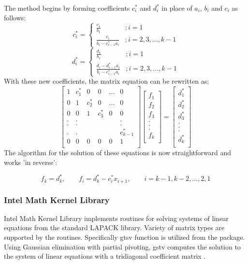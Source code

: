 \documentclass[12pt, oneside]{book}
\theoremstyle{plain}
\theoremstyle{definition}
\begin{document}
The method begins by forming coefficients \(c^{*}_i\) and \(d^{*}_i\) in place of \(a_i\), \(b_i\) and \(c_i\) as follows:
$$
c^{*}_i = \left\{
     \begin{array}{lr}
       \frac{c_1}{b_1} & ; i = 1\\
       \frac{c_i}{b_i - c^{*}_{i-1} a_i} & ; i = 2,3,...,k-1
     \end{array}
   \right.
$$
$$   
d^{*}_i = \left\{
     \begin{array}{lr}
       \frac{d_1}{b_1} & ; i = 1\\
       \frac{d_i-d^{*}_{i-1} a_i}{b_i - c^{*}_{i-1} a_i} & ; i = 2,3,...,k-1
     \end{array}
   \right.
   $$
With these new coefficients, the matrix equation can be rewritten as:
$$
\begin{bmatrix}  
1 & c^{*}_1 & 0 & 0 & ... & 0 \\ 
0 & 1 & c^{*}_2 & 0 & ... & 0 \\ 
0 & 0 & 1 & c^{*}_3 & 0 & 0 \\ 
. & . &  &  &  & . \\ 
. & . &  &  &  & . \\ 
. & . &  &  &  & c^{*}_{k-1} \\ 
0 & 0 & 0 & 0 & 0 & 1 \\ 
\end{bmatrix} \begin{bmatrix}  
f_1 \\ 
f_2 \\ 
f_3 \\ 
.\\ 
.\\ 
.\\ 
f_k \\ 
\end{bmatrix} = \begin{bmatrix} 
d^{*}_1 \\ 
d^{*}_2 \\ 
d^{*}_3 \\ 
.\\ 
.\\ 
.\\ 
d^{*}_k \\ 
\end{bmatrix}
$$
The algorithm for the solution of these equations is now straightforward and works 'in reverse':

\[ f_k = d^{*}_k, \qquad f_i = d^{*}_k - c^{*}_i x_{i+1}, \qquad i = k-1, k-2, ... ,2,1 \]


 \subsubsection{Intel Math Kernel Library}
 Intel Math Kernel Library implements routines for solving systems of linear equations   from the standard LAPACK library.  Variety of matrix types are supported by the routines. Specifically gtsv function is utilized from the package. Using Gaussian elimination with partial pivoting, gstv computes the solution to the system of linear equations with a tridiagonal coefficient matrix \cite{gtsv}.  
 
\end{document}
